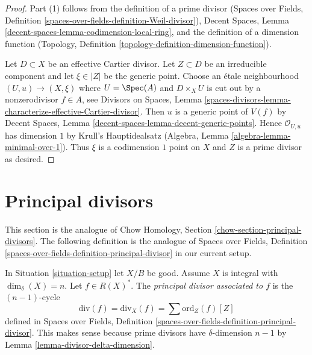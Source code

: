 \begin{proof}
Part (1) follows from the definition of a prime divisor
(Spaces over Fields, Definition
\ref{spaces-over-fields-definition-Weil-divisor}),
Decent Spaces, Lemma \ref{decent-spaces-lemma-codimension-local-ring},
and the definition of a dimension function
(Topology, Definition \ref{topology-definition-dimension-function}).

\medskip\noindent
Let $D \subset X$ be an effective Cartier divisor. Let $Z \subset D$
be an irreducible component and let $\xi \in |Z|$ be the generic point.
Choose an \'etale neighbourhood $(U, u) \to (X, \xi)$ where $U = \Spec(A)$
and $D \times_X U$ is cut out by a nonzerodivisor $f \in A$, see
Divisors on Spaces, Lemma
\ref{spaces-divisors-lemma-characterize-effective-Cartier-divisor}.
Then $u$ is a generic point of $V(f)$ by
Decent Spaces, Lemma \ref{decent-spaces-lemma-decent-generic-points}.
Hence $\mathcal{O}_{U, u}$ has dimension $1$ by
Krull's Hauptidealsatz (Algebra, Lemma \ref{algebra-lemma-minimal-over-1}).
Thus $\xi$ is a codimension $1$ point on $X$ and $Z$ is a prime
divisor as desired.
\end{proof}












\section{Principal divisors}
\label{section-principal-divisors}

\noindent
This section is the analogue of
Chow Homology, Section \ref{chow-section-principal-divisors}.
The following definition is the analogue of
Spaces over Fields, Definition
\ref{spaces-over-fields-definition-principal-divisor}
in our current setup.

\begin{definition}
\label{definition-principal-divisor}
In Situation \ref{situation-setup} let $X/B$ be good. Assume $X$ is
integral with $\dim_\delta(X) = n$.
Let $f \in R(X)^*$. The {\it principal divisor associated to $f$}
is the $(n - 1)$-cycle
$$
\text{div}(f) = \text{div}_X(f) = \sum \text{ord}_Z(f) [Z]
$$
defined in Spaces over Fields, Definition
\ref{spaces-over-fields-definition-principal-divisor}.
This makes sense because prime divisors have $\delta$-dimension $n - 1$ by
Lemma \ref{lemma-divisor-delta-dimension}.
\end{definition}

